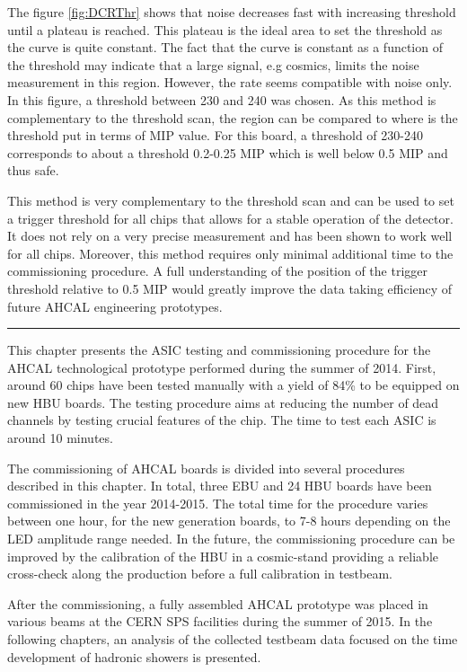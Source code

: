 The figure \ref{fig:DCRThr} shows that noise decreases fast with increasing threshold until a plateau is reached. This plateau is the ideal area to set the threshold as the curve is quite constant. The fact that the curve is constant as a function of the threshold may indicate that a large signal, e.g cosmics, limits the noise measurement in this region. However, the rate seems compatible with noise only. In this figure, a threshold between 230 and 240 was chosen. As this method is complementary to the threshold scan, the region can be compared to where is the threshold put in terms of MIP value. For this board, a threshold of 230-240 corresponds to about a threshold 0.2-0.25 MIP which is well below 0.5 MIP and thus safe.

This method is very complementary to the threshold scan and can be used to set a trigger threshold for all chips that allows for a stable operation of the detector. It does not rely on a very precise measurement and has been shown to work well for all chips. Moreover, this method requires only minimal additional time to the commissioning procedure. A full understanding of the position of the trigger threshold relative to 0.5 MIP would greatly improve the data taking efficiency of future AHCAL engineering prototypes.

\begin{center}
  \rule{0.5\textwidth}{.4pt}
\end{center}

This chapter presents the ASIC testing and commissioning procedure for the AHCAL technological prototype performed during the summer of 2014. First, around 60 chips have been tested manually with a yield of 84\% to be equipped on new HBU boards. The testing procedure aims at reducing the number of dead channels by testing crucial features of the chip. The time to test each ASIC is around 10 minutes.

The commissioning of AHCAL boards is divided into several procedures described in this chapter. In total, three EBU and 24 HBU boards have been commissioned in the year 2014-2015. The total time for the procedure varies between one hour, for the new generation boards, to 7-8 hours depending on the LED amplitude range needed. In the future, the commissioning procedure can be improved by the calibration of the HBU in a cosmic-stand providing a reliable cross-check along the production before a full calibration in testbeam.

After the commissioning, a fully assembled AHCAL prototype was placed in various beams at the CERN SPS facilities during the summer of 2015. In the following chapters, an analysis of the collected testbeam data focused on the time development of hadronic showers is presented.
